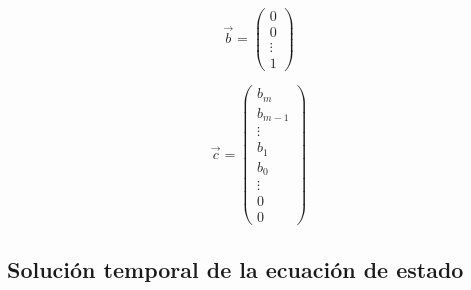 \documentclass[12pt]{article}
\numberwithin{equation}{subsection}
\begin{document}
\begin{equation}
\vec{b} =
\begin{pmatrix}
0 \\
0 \\
\vdots \\
1
\end{pmatrix}
\end{equation}

\begin{equation}
\vec{c} =
\begin{pmatrix}
b_m     \\
b_{m-1} \\
\vdots  \\
b_1     \\
b_0     \\
\vdots  \\
0       \\
0
\end{pmatrix}
\end{equation}

\subsection{Solución temporal de la ecuación de estado}
\end{document}
